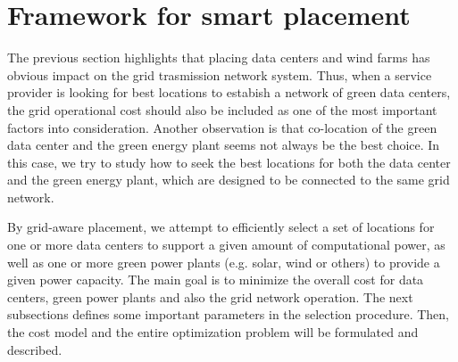 \section{Framework for smart placement}
\label{sec:framework}

The previous section highlights that placing data centers and wind
farms has obvious impact on the grid trasmission network system. Thus,
when a service provider is looking for best locations to estabish a
network of green data centers, the grid operational cost should also
be included as one of the most important factors into
consideration. Another observation is that co-location of the green
data center and the green energy plant seems not always be the best
choice. In this case, we try to study how to seek the best locations
for both the data center and the green energy plant, which are
designed to be connected to the same grid network.

By grid-aware placement, we attempt to efficiently select a set of locations for one or more data centers to support a given amount of computational power, as well as one or more green power plants (e.g. solar, wind or others) to provide a given power capacity. The main goal is to minimize the overall cost for data centers, green power plants and also the grid network operation. The next subsections defines some important parameters in the selection procedure. Then, the cost model and the entire optimization problem will be formulated and described.

